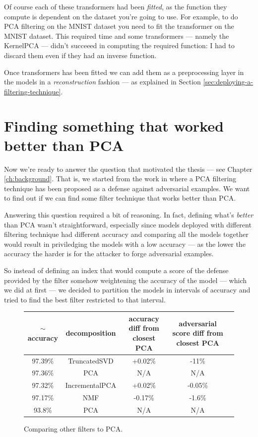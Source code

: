 Of course each of these transformers had been \emph{fitted}, as the
function they compute is dependent on the dataset you're going to use.
For example, to do PCA filtering on the MNIST dataset you need to fit
the transformer on the MNIST dataset. This required time and some
transformers --- namely the KernelPCA --- didn't succeeed in computing
the required function: I had to discard them even if they had an
inverse function.

Once transformers has been fitted we can add them as a preprocessing
layer in the models in a \emph{reconstruction} fashion --- as explained
in Section \ref{sec:deploying-a-filtering-technique}.

\section{Finding something that worked better than PCA}

Now we're ready to answer the question that motivated the thesis ---
see Chapter \ref{ch:background}. That is, we started from the work in
\cite{bhagoji2018enhancing} where a PCA filtering technique has been
proposed as a defense against adversarial examples. We want to find out
if we can find some filter technique that works better than PCA.

Answering this question required a bit of reasoning. In fact, defining
what's \emph{better} than PCA wasn't straightforward, especially since
models deployed with different filtering technique had different
accuracy and comparing all the models together would result in
priviledging the models with a low accuracy --- as the lower the
accuracy the harder is for the attacker to forge adversarial examples.

So instead of defining an index that would compute a score of the
defense provided by the filter somehow weightening the accuracy of the
model --- which we did at first --- we decided to partition the models
in intervals of accuracy and tried to find the best filter restricted
to that interval.

\begin{figure}
  \centering
  \begin{tabular}{|c|c|c|c|c|}
    \hline
    $\sim$accuracy & decomposition & accuracy diff from closest PCA &
    adversarial score diff from closest PCA \\
    \hline
    \hline
    97.39\% & TruncatedSVD & +0.02\% & -11\% \\
    \hline
    97.36\% & PCA & N/A & N/A \\
    \hline
    97.32\% & IncrementalPCA & +0.02\% & -0.05\% \\
    \hline
    97.17\% & NMF & -0.17\% & -1.6\% \\
    \hline
    93.8\% & PCA & N/A & N/A \\
    \hline
  \end{tabular}
  \caption{Comparing other filters to PCA.}
  \label{fig:filters-comparison}
\end{figure}

